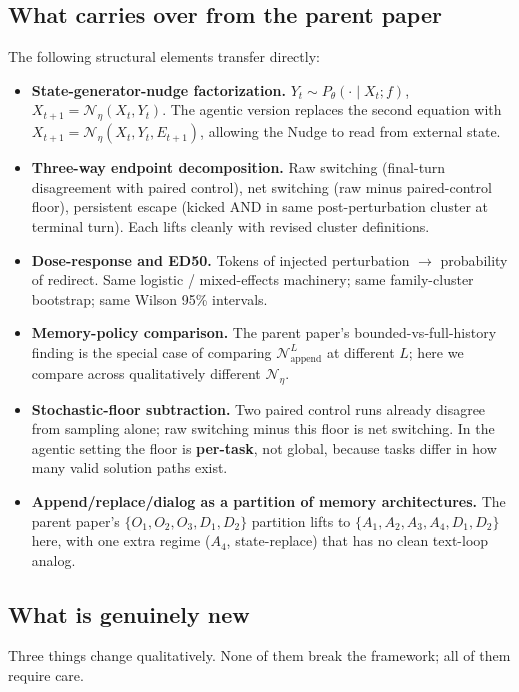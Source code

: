 \documentclass{article}
\theoremstyle{plain}
\theoremstyle{definition}
\begin{document}
\subsection{What carries over from the parent paper}

The following structural elements transfer directly:

\begin{itemize}
  \item \textbf{State-generator-nudge factorization.} $Y_t \sim P_\theta(\cdot \mid X_t; f)$, $X_{t+1} = \mathcal{N}_\eta(X_t, Y_t)$. The agentic version replaces the second equation with $X_{t+1} = \mathcal{N}_\eta(X_t, Y_t, E_{t+1})$, allowing the Nudge to read from external state.
  \item \textbf{Three-way endpoint decomposition.} Raw switching (final-turn disagreement with paired control), net switching (raw minus paired-control floor), persistent escape (kicked AND in same post-perturbation cluster at terminal turn). Each lifts cleanly with revised cluster definitions.
  \item \textbf{Dose-response and ED50.} Tokens of injected perturbation $\to$ probability of redirect. Same logistic / mixed-effects machinery; same family-cluster bootstrap; same Wilson 95\% intervals.
  \item \textbf{Memory-policy comparison.} The parent paper's bounded-vs-full-history finding is the special case of comparing $\mathcal{N}_\text{append}^L$ at different $L$; here we compare across qualitatively different $\mathcal{N}_\eta$.
  \item \textbf{Stochastic-floor subtraction.} Two paired control runs already disagree from sampling alone; raw switching minus this floor is net switching. In the agentic setting the floor is \textbf{per-task}, not global, because tasks differ in how many valid solution paths exist.
  \item \textbf{Append/replace/dialog as a partition of memory architectures.} The parent paper's $\{O_1, O_2, O_3, D_1, D_2\}$ partition lifts to $\{A_1, A_2, A_3, A_4, D_1, D_2\}$ here, with one extra regime ($A_4$, state-replace) that has no clean text-loop analog.
\end{itemize}

\subsection{What is genuinely new}

Three things change qualitatively. None of them break the framework; all of them require care.
\end{document}
